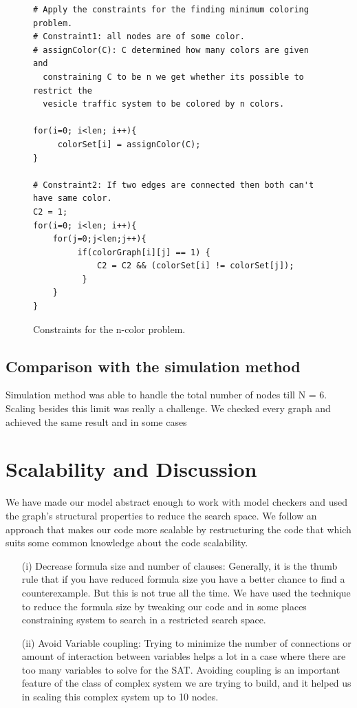\documentclass[preprint,12pt]{elsarticle}
\begin{document}
\begin{figure}[ht]
\begin{verbatim}
# Apply the constraints for the finding minimum coloring problem.
# Constraint1: all nodes are of some color.
# assignColor(C): C determined how many colors are given and 
  constraining C to be n we get whether its possible to restrict the 
  vesicle traffic system to be colored by n colors.
                   
for(i=0; i<len; i++){
     colorSet[i] = assignColor(C);
}

# Constraint2: If two edges are connected then both can't have same color.
C2 = 1;
for(i=0; i<len; i++){
	for(j=0;j<len;j++){
	     if(colorGraph[i][j] == 1) {
             C2 = C2 && (colorSet[i] != colorSet[j]); 
          }
    }
}
\end{verbatim}
\caption{Constraints for the n-color problem.}
\label{code:motivate}
\end{figure}


\subsection{Comparison with the simulation method}
Simulation method was able to handle the total number of nodes till N = 6. Scaling besides this limit was really a challenge. We checked every graph and achieved the same result and in some cases  

\section{Scalability and Discussion}
We have made our model abstract enough to work with model checkers and used the graph's structural properties to reduce the search space. We follow an approach that makes our code more scalable by restructuring the code that which suits some common knowledge about the code scalability.
\begin{enumerate}

\item[(i)] Decrease formula size and number of clauses: Generally, it is the thumb rule that if you have reduced formula size you have a better chance to find a counterexample. But this is not true all the time. We have used the technique to reduce the formula size by tweaking our code and in some places constraining system to search in a restricted search space. 

\item[(ii)] Avoid Variable coupling: Trying to minimize the number of connections or amount of interaction between variables helps a lot in a case where there are too many variables to solve for the SAT. Avoiding coupling is an important feature of the class of complex system we are trying to build, and it helped us in scaling this complex system up to 10 nodes.
\\ 
\end{enumerate}
\end{document}
